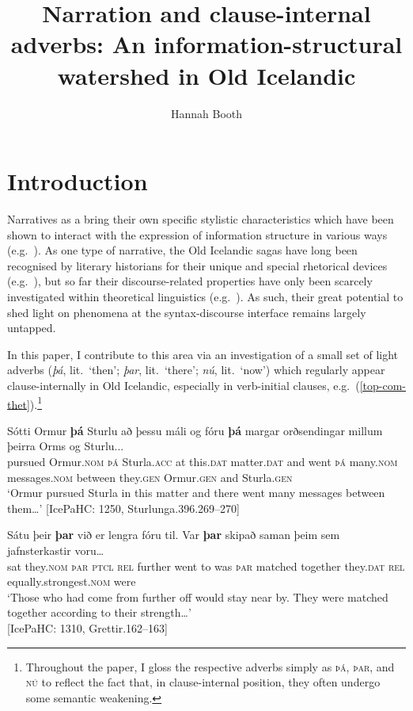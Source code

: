 \documentclass[output=paper,colorlinks,citecolor=brown]{langscibook}
\author{Hannah Booth\orcid{}\affiliation{Ghent University}}
\title{Narration and clause-internal adverbs: An information-structural watershed in Old Icelandic}
\begin{document}
\maketitle

\section{Introduction}

\noindent Narratives as a  bring their own specific stylistic characteristics which have been shown to interact with the expression of information structure in various ways (e.g.~\citealp{carroll2003information,dimroth2010given,riester2015analyzing}). 
As one type of narrative, the Old Icelandic sagas have long been recognised by literary historians for their unique  and special rhetorical devices (e.g.~\citealp{clover1974scene,olason2004family,pehlpstead2017time}), but so far their discourse-related properties have only been scarcely investigated within theoretical linguistics (e.g.~\citealp{hroarsdottir2009ov,booth-beck20200jhs}). As such, their great potential to shed light on phenomena at the syntax-discourse interface remains largely untapped.

In this paper, I contribute to this area via an investigation of a small set of light adverbs (\textit{þá}, lit.~`then'; \textit{þar}, lit.~`there'; \textit{nú}, lit.~`now') which regularly appear clause-internally in Old Icelandic, especially in verb-initial clauses, e.g.~(\ref{top-com-thet}).\footnote{Throughout the paper, I gloss the respective adverbs simply as \textsc{þá}, \textsc{þar}, and \textsc{nú} to reflect the fact that, in clause-internal position, they often undergo some semantic weakening.}

\ea \label{top-com-thet}
\ea
\gll Sótti Ormur \textbf{þá} Sturlu að þessu máli og fóru \textbf{þá} margar orðsendingar millum þeirra Orms og Sturlu... \\
pursued Ormur.\textsc{nom} \textsc{þá} Sturla.\textsc{acc} at this.\textsc{dat} matter.\textsc{dat} and went \textsc{þá} many.\textsc{nom} messages.\textsc{nom} between they.\textsc{gen} Ormur.\textsc{gen} and Sturla.\textsc{gen}\\
\glt `Ormur pursued Sturla in this matter and there went many messages between them\dots' \hfill [IcePaHC: 1250, Sturlunga.396.269--270]
        
\ex
\gll Sátu þeir \textbf{þar} við er lengra fóru til. Var \textbf{þar} skipað saman þeim sem jafnsterkastir voru\dots\\
sat they.\textsc{nom} \textsc{þar} \textsc{ptcl} \textsc{rel} further went to was \textsc{þar} matched together they.\textsc{dat} \textsc{rel} equally.strongest.\textsc{nom} were \\
\glt `Those who had come from further off would stay near by. They were matched together according to their strength\dots' \\ \hfill [IcePaHC: 1310, Grettir.162--163]
\end{document}
